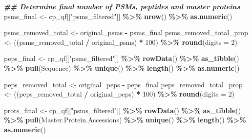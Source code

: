 \documentclass[9pt,a4paper,]{extarticle}
\newenvironment{Shaded}{\begin{snugshade}}{\end{snugshade}}
\newcommand{\AttributeTok}[1]{\textcolor[rgb]{0.13,0.29,0.53}{#1}}
\newcommand{\DecValTok}[1]{\textcolor[rgb]{0.00,0.00,0.81}{#1}}
\newcommand{\DocumentationTok}[1]{\textcolor[rgb]{0.56,0.35,0.01}{\textbf{\textit{#1}}}}
\newcommand{\FunctionTok}[1]{\textcolor[rgb]{0.13,0.29,0.53}{\textbf{#1}}}
\newcommand{\NormalTok}[1]{#1}
\newcommand{\OtherTok}[1]{\textcolor[rgb]{0.56,0.35,0.01}{#1}}
\newcommand{\SpecialCharTok}[1]{\textcolor[rgb]{0.81,0.36,0.00}{\textbf{#1}}}
\newcommand{\StringTok}[1]{\textcolor[rgb]{0.31,0.60,0.02}{#1}}
\begin{document}
\begin{Shaded}
\begin{Highlighting}[]
\DocumentationTok{\#\# Determine final number of PSMs, peptides and master proteins}
\NormalTok{psms\_final }\OtherTok{\textless{}{-}}\NormalTok{ cp\_qf[[}\StringTok{"psms\_filtered"}\NormalTok{]] }\SpecialCharTok{\%\textgreater{}\%}
  \FunctionTok{nrow}\NormalTok{() }\SpecialCharTok{\%\textgreater{}\%}
  \FunctionTok{as.numeric}\NormalTok{()}

\NormalTok{psms\_removed\_total }\OtherTok{\textless{}{-}}\NormalTok{ original\_psms }\SpecialCharTok{{-}}\NormalTok{ psms\_final}
\NormalTok{psms\_removed\_total\_prop }\OtherTok{\textless{}{-}}\NormalTok{ ((psms\_removed\_total }\SpecialCharTok{/}\NormalTok{ original\_psms) }\SpecialCharTok{*} \DecValTok{100}\NormalTok{) }\SpecialCharTok{\%\textgreater{}\%}
  \FunctionTok{round}\NormalTok{(}\AttributeTok{digits =} \DecValTok{2}\NormalTok{)}

\NormalTok{peps\_final }\OtherTok{\textless{}{-}}\NormalTok{ cp\_qf[[}\StringTok{"psms\_filtered"}\NormalTok{]] }\SpecialCharTok{\%\textgreater{}\%}
  \FunctionTok{rowData}\NormalTok{() }\SpecialCharTok{\%\textgreater{}\%}
  \FunctionTok{as\_tibble}\NormalTok{() }\SpecialCharTok{\%\textgreater{}\%}
  \FunctionTok{pull}\NormalTok{(Sequence) }\SpecialCharTok{\%\textgreater{}\%}
  \FunctionTok{unique}\NormalTok{() }\SpecialCharTok{\%\textgreater{}\%}
  \FunctionTok{length}\NormalTok{() }\SpecialCharTok{\%\textgreater{}\%}
  \FunctionTok{as.numeric}\NormalTok{()}

\NormalTok{peps\_removed\_total }\OtherTok{\textless{}{-}}\NormalTok{ original\_peps }\SpecialCharTok{{-}}\NormalTok{ peps\_final}
\NormalTok{peps\_removed\_total\_prop }\OtherTok{\textless{}{-}}\NormalTok{ ((peps\_removed\_total }\SpecialCharTok{/}\NormalTok{ original\_peps) }\SpecialCharTok{*} \DecValTok{100}\NormalTok{) }\SpecialCharTok{\%\textgreater{}\%}
  \FunctionTok{round}\NormalTok{(}\AttributeTok{digits =} \DecValTok{2}\NormalTok{)}

\NormalTok{prots\_final }\OtherTok{\textless{}{-}}\NormalTok{ cp\_qf[[}\StringTok{"psms\_filtered"}\NormalTok{]] }\SpecialCharTok{\%\textgreater{}\%}
  \FunctionTok{rowData}\NormalTok{() }\SpecialCharTok{\%\textgreater{}\%}
  \FunctionTok{as\_tibble}\NormalTok{() }\SpecialCharTok{\%\textgreater{}\%}
  \FunctionTok{pull}\NormalTok{(Master.Protein.Accessions) }\SpecialCharTok{\%\textgreater{}\%}
  \FunctionTok{unique}\NormalTok{() }\SpecialCharTok{\%\textgreater{}\%}
  \FunctionTok{length}\NormalTok{() }\SpecialCharTok{\%\textgreater{}\%}
  \FunctionTok{as.numeric}\NormalTok{()}


\end{Highlighting}
\end{Shaded}
\end{document}
